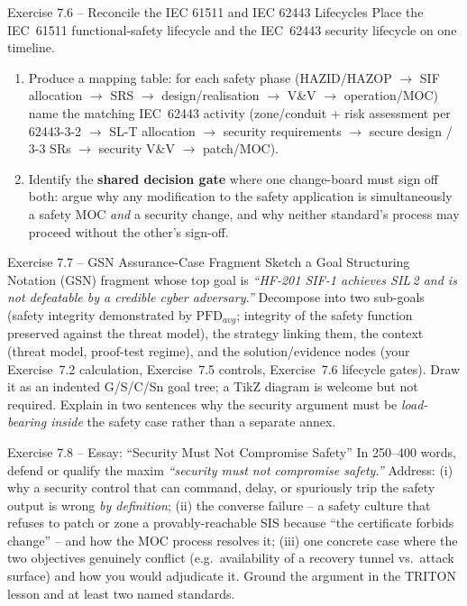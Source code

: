 \documentclass[11pt,a4paper]{article}
\begin{document}
\begin{taskbox}{Exercise 7.6 -- Reconcile the IEC 61511 and IEC 62443 Lifecycles}
Place the IEC~61511 functional-safety lifecycle and the IEC~62443 security
lifecycle on one timeline.
\begin{enumerate}\setlength{\itemsep}{1pt}
  \item Produce a mapping table: for each safety phase
        (HAZID/HAZOP $\to$ SIF allocation $\to$ SRS $\to$ design/realisation
        $\to$ V\&V $\to$ operation/MOC) name the matching IEC~62443 activity
        (zone/conduit + risk assessment per 62443-3-2 $\to$ SL-T allocation
        $\to$ security requirements $\to$ secure design / 3-3 SRs $\to$
        security V\&V $\to$ patch/MOC).
  \item Identify the \textbf{shared decision gate} where one change-board must
        sign off both: argue why any modification to the safety application is
        simultaneously a safety MOC \emph{and} a security change, and why
        neither standard's process may proceed without the other's sign-off.
\end{enumerate}
\end{taskbox}

\begin{taskbox}{Exercise 7.7 -- GSN Assurance-Case Fragment}
Sketch a Goal Structuring Notation (GSN) fragment whose top goal is
\emph{``HF-201 SIF-1 achieves SIL\,2 and is not defeatable by a credible cyber
adversary.''} Decompose into two sub-goals (safety integrity demonstrated by
$\mathrm{PFD}_{avg}$; integrity of the safety function preserved against the
threat model), the strategy linking them, the context (threat model,
proof-test regime), and the solution/evidence nodes (your Exercise~7.2
calculation, Exercise~7.5 controls, Exercise~7.6 lifecycle gates). Draw it as
an indented G/S/C/Sn goal tree; a TikZ diagram is welcome but not required.
Explain in two sentences why the security argument must be \emph{load-bearing
inside} the safety case rather than a separate annex.
\end{taskbox}

\begin{taskbox}{Exercise 7.8 -- Essay: ``Security Must Not Compromise Safety''}
In 250--400 words, defend or qualify the maxim \emph{``security must not
compromise safety.''} Address: (i) why a security control that can command,
delay, or spuriously trip the safety output is wrong \emph{by definition};
(ii) the converse failure -- a safety culture that refuses to patch or zone a
provably-reachable SIS because ``the certificate forbids change'' -- and how
the MOC process resolves it; (iii) one concrete case where the two objectives
genuinely conflict (e.g.\ availability of a recovery tunnel vs.\ attack
surface) and how you would adjudicate it. Ground the argument in the TRITON
lesson and at least two named standards.
\end{taskbox}
\end{document}
